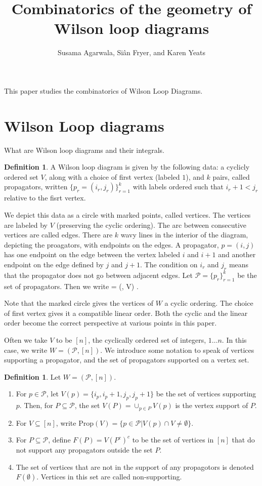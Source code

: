 \documentclass[11pt]{article}
\title{Combinatorics of the geometry of Wilson loop diagrams}
\author{Susama Agarwala, Si\^an Fryer, and Karen Yeats}
\def\bas #1\eas{\begin{align*} #1 \end{align*}}
\newcommand{\cP}{\mathcal{P}}
\newcommand{\Prop}{\textrm{Prop}}
\theoremstyle{remark}
\theoremstyle{definition}
\newtheorem{dfn}[thm]{Definition}
\begin{document}
\maketitle

This paper studies the combinatorics of Wilson Loop Diagrams.
\section{Wilson Loop diagrams}\label{section background}

What are Wilson loop diagrams and their integrals.

\begin{dfn}\label{WLdfn}
A Wilson loop diagram is given by the following data: a cyclicly ordered set $V$, along with a choice of first vertex (labeled $1$), and $k$ pairs, called propagators, written $\{p_r = (i_r, j_r)\}_{r=1}^k$ with labels ordered such that $i_r +1 < j_r$ relative to the fisrt vertex. \end{dfn}

We depict this data as a circle with marked points, called vertices. The vertices are labeled by $V$ (preserving the cyclic ordering). The arc between consecutive vertices are called edges. There are $k$ wavy lines in the interior of the diagram, depicting the proagators, with endpoints on the edges. A propagator, $p =(i,j)$ has one endpoint on the edge between the vertex labeled $i$ and $i+1$ and another endpoint on the edge defined by $j$ and $j+1$. The condition on $i_r$ and $j_r$ means that the propagator does not go between adjacent edges. Let $\cP = \{p_r\}_{r=1}^k$ be the set of propagators. Then we write \bas W = (\cP, V) \;.\eas

Note that the marked circle gives the vertices of $W$ a cyclic ordering. The choice of first vertex gives it a compatible linear order. Both the cyclic and the linear order become the correct perspective at various points in this paper. 

Often we take $V$ to be $[n]$, the cyclically ordered set of integers, $1 \ldots n$. In this case, we write $W = (\cP, [n])$. We introduce some notation to speak of vertices supporting a propagator, and the set of propagators supported on a vertex set.

\begin{dfn} \label{VPropdfn}
Let $W = (\cP, [n])$.
\begin{enumerate}
\item For $p \in \cP$, let $V(p) = \{i_p, i_p+1, j_p, j_p+1\}$ be the set of vertices supporting $p$. Then, for $P \subseteq \cP$, the set $V(P) = \cup_{p \in P} V(p)$ is the vertex support of $P$.
\item For $V \subseteq [n]$, write $\Prop(V) = \{ p \in \cP | V(p) \cap V \neq \emptyset \} $.
\item For $P \subseteq \cP$, define $F(P) = V(P^c)^c$ to be the set of vertices in $[n]$ that do not support any propagators outside the set $P$.
\item The set of vertices that are not in the support of any propagotors is denoted  $F(\emptyset)$. Vertices in this set are called non-supporting.  
\end{enumerate}
\end{dfn}
\end{document}
